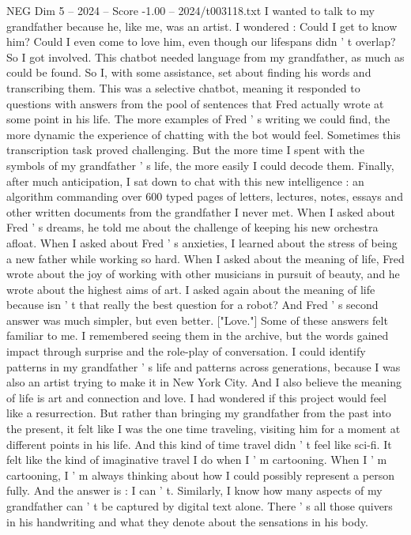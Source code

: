 \begin{textsample}{NEG Dim 5 – 2024 – Score -1.00 – 2024/t003118.txt}
I wanted to talk to my grandfather because he, like me, was an artist.
I wondered : Could I get to know him?
Could I even come to love him, even though our lifespans didn ' t overlap?
So I got involved.
This chatbot needed language from my grandfather, as much as could be found.
So I, with some assistance, set about finding his words and transcribing them.
This was a selective chatbot, meaning it responded to questions with answers from the pool of sentences that Fred actually wrote at some point in his life.
The more examples of Fred ' s writing we could find, the more dynamic the experience of chatting with the bot would feel.
Sometimes this transcription task proved challenging.
But the more time I spent with the symbols of my grandfather ' s life, the more easily I could decode them.
Finally, after much anticipation, I sat down to chat with this new intelligence : an algorithm commanding over 600 typed pages of letters, lectures, notes, essays and other written documents from the grandfather I never met.
When I asked about Fred ' s dreams, he told me about the challenge of keeping his new orchestra afloat.
When I asked about Fred ' s anxieties, I learned about the stress of being a new father while working so hard.
When I asked about the meaning of life, Fred wrote about the joy of working with other musicians in pursuit of beauty, and he wrote about the highest aims of art.
I asked again about the meaning of life because isn ' t that really the best question for a robot?
And Fred ' s second answer was much simpler, but even better. ["Love."] Some of these answers felt familiar to me.
I remembered seeing them in the archive, but the words gained impact through surprise and the role-play of conversation.
I could identify patterns in my grandfather ' s life and patterns across generations, because I was also an artist trying to make it in New York City.
And I also believe the meaning of life is art and connection and love.
I had wondered if this project would feel like a resurrection.
But rather than bringing my grandfather from the past into the present, it felt like I was the one time traveling, visiting him for a moment at different points in his life.
And this kind of time travel didn ' t feel like sci-fi.
It felt like the kind of imaginative travel I do when I ' m cartooning.
When I ' m cartooning, I ' m always thinking about how I could possibly represent a person fully.
And the answer is : I can ' t.
Similarly, I know how many aspects of my grandfather can ' t be captured by digital text alone.
There ' s all those quivers in his handwriting and what they denote about the sensations in his body.

\end{textsample}
